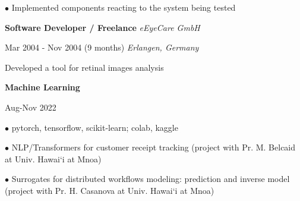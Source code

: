 \documentclass[12pt]{article}
\newcommand{\mynewsection}[2]{%
  \medskip

  \textbf{\color{colorsection}\LARGE {#1}\hspace{0.25in}{#2}}
}
\newcommand{\experience}[4]{%
  \medskip
  {\color{colorsection}\textbf{\large #1}}
  \hfill
  \textit{\small #2}

  {\small #3}
  \hfill    
  \textit{\small #4}}
\begin{document}
\begin{minipage}[t]{0.67\linewidth}
  \medskip

  $\bullet$ Implemented components reacting to the system being tested

  \bigskip
  
  \experience{Software Developer / Freelance}{%
    eEyeCare GmbH}{%
    Mar 2004 - Nov 2004 (9 months)}{%
    Erlangen, Germany}
  
  \medskip

  {\large Developed a tool for retinal images analysis}

  \bigskip
  
  \mynewsection{\faCubes}{Self-Study}
  
  \medskip

  \experience{ Machine Learning}{%
    }{%
    Aug-Nov 2022}{%
    }
  
  \medskip

  $\bullet$ pytorch, tensorflow, scikit-learn; colab, kaggle

  $\bullet$ NLP/Transformers for customer receipt tracking (project
  with Pr. M. Belcaid at Univ. Hawai`i at Mnoa)
  
  $\bullet$ Surrogates for distributed workflows modeling: prediction
  and inverse model (project with Pr. H. Casanova at Univ. Hawai`i
  at Mnoa)
\end{minipage}
\end{document}
